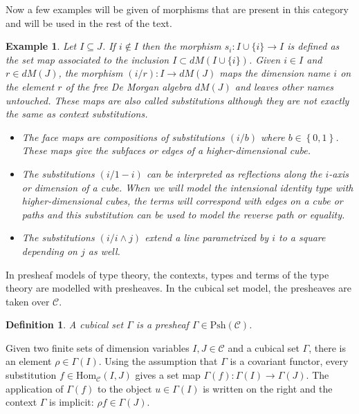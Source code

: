 \documentclass[12pt,a4paper,twoside,xetex]{book}
\newcommand{\keyword}[1]{\emph{#1}\index{#1}}
\newtheorem{definition}[theorem]{Definition}
\newtheorem{example}[theorem]{Example}
\newcommand{\Psh}[1]{\text{Psh}\left(#1\right)}
\newcommand{\homo}[3]{\text{Hom}_{#1}\left(#2,#3\right)}
\begin{document}
Now a few examples will be given of morphisms that are present in this category and will be used in the rest of the text.

\begin{example}
Let $I \subseteq J$. If $i \not \in I$ then the morphism $s_i : I \cup \{i\} \rightarrow I$ is defined as the set map associated to the inclusion $I \subset dM(I\cup \{i \})$.  Given $i \in I$ and $r \in dM(J)$, the morphism $(i/r): I \rightarrow dM(J) $ maps the dimension name $i$ on the element $r$ of the free De Morgan algebra $dM(J)$ and leaves other names untouched. These maps are also called \keyword{substitutions} although they are not exactly the same as context substitutions. 
\begin{itemize}
\item The \keyword{face maps} are compositions of substitutions $(i/b)$ where $b\in \left\{0,1\right\}$. These maps give the subfaces or edges of a higher-dimensional cube.
\item The substitutions $(i / 1- i)$ can be interpreted as reflections along the $i$-axis or dimension of a cube. When we will model the intensional identity type with higher-dimensional cubes, the terms will correspond with edges on a cube or paths and this substitution can be used to model the reverse path or equality.
\item The substitutions $(i / i \wedge j)$ extend a line parametrized by $i$ to a square depending on $j$ as well.
\end{itemize}

\end{example}

In presheaf models of type theory, the contexts, types and terms of the type theory are modelled with presheaves. In the cubical set model, the presheaves are taken over $\mathcal{C}$.

\begin{definition}\label{cubset}
A \keyword{cubical set} $\Gamma$ is a presheaf $\Gamma \in \Psh{\mathcal{C}}$.
\end{definition}

Given two finite sets of dimension variables $I,J \in \mathcal{C}$ and a cubical set $\Gamma$,
there is an element $\rho \in \Gamma (I)$. Using the assumption that $\Gamma$ 
is a covariant functor, every substitution $f \in \homo{\mathcal{C}}{I}{J}$ gives a set map $\Gamma (f) : \Gamma (I) \rightarrow \Gamma (J)$. 
The application of $\Gamma(f)$ to the object $u \in \Gamma (I)$ is written on the right and the context $\Gamma$ is implicit: $\rho f \in \Gamma(J)$. 
\end{document}
